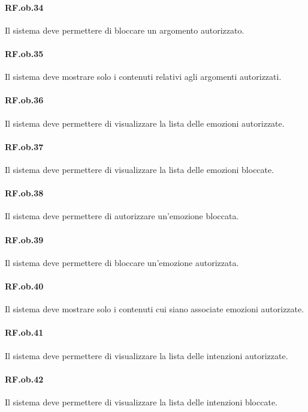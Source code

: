 \documentclass[10pt,a4paper,headinclude,footinclude,hidelinks]{scrreprt} %
\begin{document}
	\paragraph{RF.ob.34} Il sistema deve permettere di bloccare un argomento autorizzato.

	\paragraph{RF.ob.35} Il sistema deve mostrare solo i contenuti relativi agli argomenti autorizzati.

	\paragraph{RF.ob.36} Il sistema deve permettere di visualizzare la lista delle emozioni autorizzate.

	\paragraph{RF.ob.37} Il sistema deve permettere di visualizzare la lista delle emozioni bloccate.

	\paragraph{RF.ob.38} Il sistema deve permettere di autorizzare un'emozione bloccata.

	\paragraph{RF.ob.39} Il sistema deve permettere di bloccare un'emozione autorizzata.

	\paragraph{RF.ob.40} Il sistema deve mostrare solo i contenuti cui siano associate emozioni autorizzate.

	\paragraph{RF.ob.41} Il sistema deve permettere di visualizzare la lista delle intenzioni autorizzate.

	\paragraph{RF.ob.42} Il sistema deve permettere di visualizzare la lista delle intenzioni bloccate.
\end{document}
